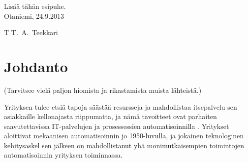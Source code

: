 \documentclass[finnish,12pt,a4paper,pdftex]{article}
\begin{document}
Lisää tähän esipuhe.\\

\vspace{5cm}
Otaniemi, 24.9.2013

\vspace{5mm}
{\hfill T T.\ A.\ Teekkari \hspace{1cm}}

\newpage


\thesistableofcontents






\cleardoublepage
\storeinipagenumber
{}
\setcounter{page}{1}


\section{Johdanto}

\thispagestyle{empty}

(Tarvitsee vielä paljon hiomista ja rikastamista muista lähteistä.)

Yrityksen tulee etsiä tapoja säästää resursseja ja mahdollistaa itsepalvelu sen asiakkaille kellonajasta riippumatta, ja nämä tavoitteet ovat parhaiten saavutettavissa IT-palvelujen ja prosessessien automatisoinnilla \citep{lamoureux}. Yritykset aloittivat mekaanisen automatisoinnin jo 1950-luvulla, ja jokainen teknologinen kehitysaskel sen jälkeen on mahdollistanut yhä monimutkaisempien toimintojen automatisoinnin yrityksen toiminnassa. 
\end{document}
